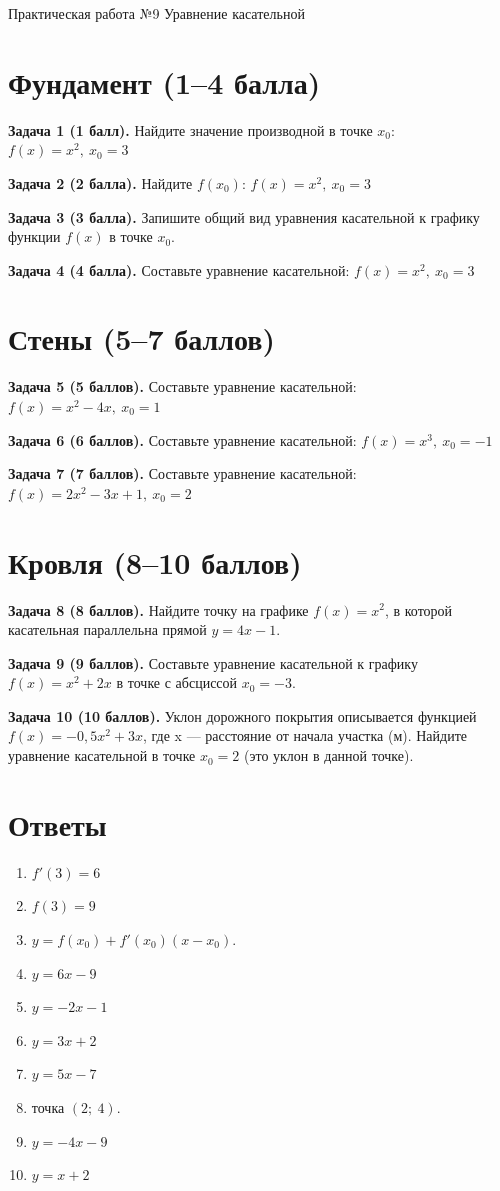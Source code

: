 \documentclass{umk-matematika}
\begin{document}
\maketitlepage
    {Практическая работа №9}
    {Уравнение касательной}
    {}

\section{Фундамент (1--4 балла)}

\textbf{Задача 1 (1 балл).} Найдите значение производной в точке $x_0$: $f(x) = x^2,\ x_0 = 3$

\textbf{Задача 2 (2 балла).} Найдите $f(x_0)$: $f(x) = x^2,\ x_0 = 3$

\textbf{Задача 3 (3 балла).} Запишите общий вид уравнения касательной к графику функции $f(x)$ в точке $x_0$.

\textbf{Задача 4 (4 балла).} Составьте уравнение касательной: $f(x) = x^2,\ x_0 = 3$

\section{Стены (5--7 баллов)}

\textbf{Задача 5 (5 баллов).} Составьте уравнение касательной: $f(x) = x^2 - 4x,\ x_0 = 1$

\textbf{Задача 6 (6 баллов).} Составьте уравнение касательной: $f(x) = x^3,\ x_0 = -1$

\textbf{Задача 7 (7 баллов).} Составьте уравнение касательной: $f(x) = 2x^2 - 3x + 1,\ x_0 = 2$

\section{Кровля (8--10 баллов)}

\textbf{Задача 8 (8 баллов).} Найдите точку на графике $f(x) = x^2$, в которой касательная параллельна прямой $y = 4x - 1$.

\textbf{Задача 9 (9 баллов).} Составьте уравнение касательной к графику $f(x) = x^2 + 2x$ в точке с абсциссой $x_0 = -3$.

\textbf{Задача 10 (10 баллов).} Уклон дорожного покрытия описывается функцией $f(x) = -0{,}5x^2 + 3x$, где x — расстояние от начала участка (м). Найдите уравнение касательной в точке $x_0 = 2$ (это уклон в данной точке).

\newpage
\section*{Ответы}

\begin{enumerate}
  \item $f'(3) = 6$
  \item $f(3) = 9$
  \item $y = f(x_0) + f'(x_0)(x - x_0)$.
  \item $y = 6x - 9$
  \item $y = -2x - 1$
  \item $y = 3x + 2$
  \item $y = 5x - 7$
  \item точка $(2;\ 4)$.
  \item $y = -4x - 9$
  \item $y = x + 2$
\end{enumerate}
\end{document}
